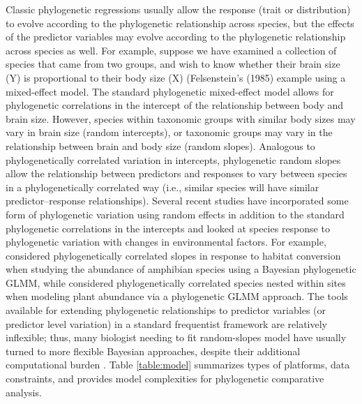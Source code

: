 \documentclass[12pt]{article}
\begin{document}
Classic phylogenetic regressions usually allow the response (trait or distribution) to evolve according to the phylogenetic relationship across species, but the effects of the predictor variables may evolve according to the phylogenetic relationship across species as well. 
For example, suppose we have examined a collection of species that came from two groups, and wish to know whether their brain size (Y) is proportional to their body size (X) (Felsenstein's (1985) example using a mixed-effect model. 
The standard phylogenetic mixed-effect model allows for phylogenetic correlations in the intercept of the relationship between body and brain size. 
However, species within taxonomic groups with similar body sizes may vary in brain size (random intercepts), or taxonomic groups may vary in the relationship between brain and body size (random slopes). 
Analogous to phylogenetically correlated variation in intercepts, phylogenetic random slopes allow the relationship between predictors and responses to vary between species in a phylogenetically correlated way (i.e., similar species will have similar predictor--response relationships).
Several recent studies have incorporated some form of phylogenetic variation using random effects in addition to the standard phylogenetic correlations in the intercepts and looked at species response to phylogenetic variation with changes in environmental factors.
For example, \cite{nowakowski2018phylogenetic} considered phylogenetically correlated slopes in response to habitat conversion when studying the abundance of amphibian species using a Bayesian phylogenetic GLMM, while \cite{li2017canfun} considered phylogenetically correlated species nested within sites when modeling plant abundance via a phylogenetic GLMM approach. 
The tools available for extending phylogenetic relationships to predictor variables (or predictor level variation) in a standard frequentist framework are relatively inflexible; thus, many biologist needing to fit random-slopes model have usually turned to more flexible Bayesian approaches, despite their additional computational burden \citep{hadfield2010mcmc, burkner2018brms}.
Table \ref{table:model} summarizes types of platforms, data constraints, and provides model complexities for phylogenetic comparative analysis.
\end{document}

